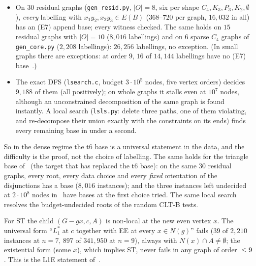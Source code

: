 \documentclass[11pt]{amsart}
\theoremstyle{definition}
\begin{document}
\begin{itemize}
\item On $30$ residual graphs (\texttt{gen\_resid.py}, $|O|=8$, six per shape $C_4,K_3,P_3,K_2,\emptyset$),
\emph{every} labelling with $x_1y_2,x_2y_3\in E(B)$ ($368$--$720$ per graph, $16{,}032$ in all)
has an (E7) append base; every witness checked. The same holds on $15$ residual graphs with
$|O|=10$ ($8{,}016$ labellings) and on $6$ sparse $C_4$ graphs of \texttt{gen\_core.py}
($2{,}208$ labellings): $26{,}256$ labellings, no exception. (In small graphs there are exceptions:
at order $9$, $16$ of $14{,}144$ labellings have no (E7) base~\cite[E28]{T6}.)
\item The exact DFS (\texttt{lsearch.c}, budget $3\cdot10^5$ nodes, five vertex orders) decides
$9{,}188$ of them (all positively); on whole graphs it stalls even at $10^7$ nodes, although an
unconstrained decomposition of the same graph is found instantly. A local search
(\texttt{lsls.py}: delete three paths, one of them violating, and re-decompose their union exactly
with the constraints on its ends) finds every remaining base in under a second.
\end{itemize}
So in the dense regime the t6 base is a universal statement in the data, and the difficulty is
the proof, not the choice of labelling. The same holds for the triangle base of~\cite{DT} (the target that has
replaced the t6 base): on the same $30$ residual graphs, every root, every data choice and every
\emph{fixed} orientation of the disjunctions has a base ($8{,}016$ instances); and the three
instances left undecided at $2\cdot10^8$ nodes in~\cite{DT} have bases at the first choice tried. The same local search resolves the budget-undecided roots
of the random CLT-B tests.

For ST the child $(G-gx,c,A)$ is non-local at the new even vertex $x$. The universal form
``$L_1^*$ at $c$ together with EE at every $x\in N(g)$'' fails ($39$ of $2{,}210$ instances at
$n=7$, $897$ of $341{,}950$ at $n=9$), always with $N(x)\cap A\ne\emptyset$; the existential form
(some $x$), which implies ST, never fails in any graph of order $\le9$. This is the L1E statement of~\cite{L1I}.
\end{document}

